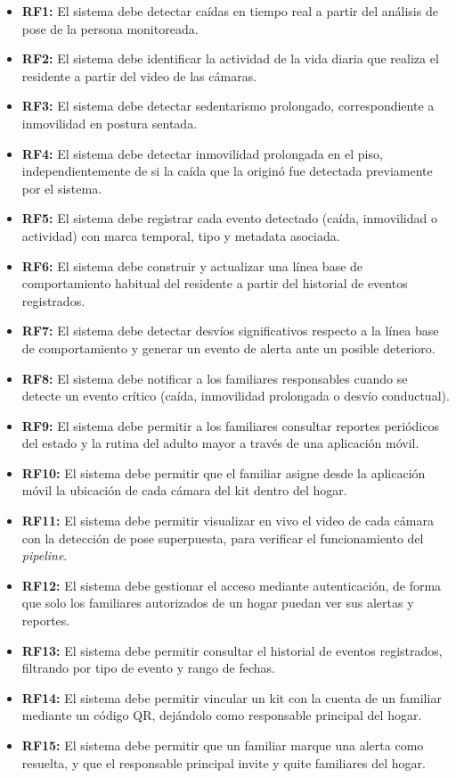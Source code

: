 \begin{itemize}
    \item \textbf{RF1:} El sistema debe detectar caídas en tiempo real a partir del análisis de pose de la persona monitoreada.
    \item \textbf{RF2:} El sistema debe identificar la actividad de la vida diaria que realiza el residente a partir del video de las cámaras.
    \item \textbf{RF3:} El sistema debe detectar sedentarismo prolongado, correspondiente a inmovilidad en postura sentada.
    \item \textbf{RF4:} El sistema debe detectar inmovilidad prolongada en el piso, independientemente de si la caída que la originó fue detectada previamente por el sistema.
    \item \textbf{RF5:} El sistema debe registrar cada evento detectado (caída, inmovilidad o actividad) con marca temporal, tipo y metadata asociada.
    \item \textbf{RF6:} El sistema debe construir y actualizar una línea base de comportamiento habitual del residente a partir del historial de eventos registrados.
    \item \textbf{RF7:} El sistema debe detectar desvíos significativos respecto a la línea base de comportamiento y generar un evento de alerta ante un posible deterioro.
    \item \textbf{RF8:} El sistema debe notificar a los familiares responsables cuando se detecte un evento crítico (caída, inmovilidad prolongada o desvío conductual).
    \item \textbf{RF9:} El sistema debe permitir a los familiares consultar reportes periódicos del estado y la rutina del adulto mayor a través de una aplicación móvil.
    \item \textbf{RF10:} El sistema debe permitir que el familiar asigne desde la aplicación móvil la ubicación de cada cámara del kit dentro del hogar.
    \item \textbf{RF11:} El sistema debe permitir visualizar en vivo el video de cada cámara con la detección de pose superpuesta, para verificar el funcionamiento del \textit{pipeline}.
    \item \textbf{RF12:} El sistema debe gestionar el acceso mediante autenticación, de forma que solo los familiares autorizados de un hogar puedan ver sus alertas y reportes.
    \item \textbf{RF13:} El sistema debe permitir consultar el historial de eventos registrados, filtrando por tipo de evento y rango de fechas.
    \item \textbf{RF14:} El sistema debe permitir vincular un kit con la cuenta de un familiar mediante un código QR, dejándolo como responsable principal del hogar.
    \item \textbf{RF15:} El sistema debe permitir que un familiar marque una alerta como resuelta, y que el responsable principal invite y quite familiares del hogar.
\end{itemize}
\vspace*{2pt}

